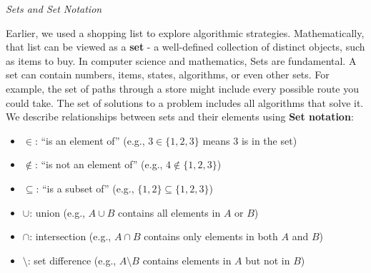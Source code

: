 \documentclass[12pt]{report}
\begin{document}
\begin{center}
    \vspace{0cm}
    {\Large\itshape Sets and Set Notation\par}
\end{center}
Earlier, we used a shopping list to explore algorithmic strategies. Mathematically, that list can be viewed as a \textbf{set} - a well-defined collection of distinct objects, such as items to buy.
In computer science and mathematics, Sets are fundamental.
A set can contain numbers, items, states, algorithms, or even other sets.
For example, the set of paths through a store might include every possible route you could take.
The set of solutions to a problem includes all algorithms that solve it.
We describe relationships between sets and their elements using \textbf{Set notation}:
\begin{itemize}
    \item $\in$: “is an element of” (e.g., $3 \in \{1, 2, 3\}$ means 3 is in the set)
    \item $\notin$: “is not an element of” (e.g., $4 \notin \{1, 2, 3\}$)
    \item $\subseteq$: “is a subset of” (e.g., $\{1,2\} \subseteq \{1,2,3\}$)
    \item $\cup$: union (e.g., $A \cup B$ contains all elements in $A$ or $B$)
    \item $\cap$: intersection (e.g., $A \cap B$ contains only elements in both $A$ and $B$)
    \item $\setminus$: set difference (e.g., $A \setminus B$ contains elements in $A$ but not in $B$)
\end{itemize}
\end{document}
